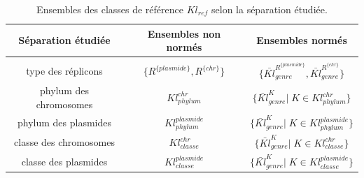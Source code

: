  \begin{table}[h]
	\caption{Ensembles des classes de référence $Kl_{ref}$ selon la séparation étudiée.} \label{tabklref}	
	\begin{center}
 	\begin{tabular}{c|c|c}
	\textbf{Séparation étudiée} & \textbf{Ensembles non normés} & \textbf{Ensembles normés}\\
	\hline
	&\\[-0.2cm]
	type des réplicons & $\{R^{\{plasmide\}}, R^{\{chr\}}\}$ & $\{\bar{Kl}^{R^{\{plasmide\}}}_{genre}, \bar{Kl}_{genre}^{R^{\{chr\}}}\}$\\
	phylum des chromosomes & $Kl_{phylum}^{chr}$ & $\{\bar{Kl}^{K}_{genre}|\;  K \in Kl_{phylum}^{chr}\}$\\
	phylum des plasmides & $Kl_{phylum}^{plasmide}$ & $\{\bar{Kl}^{K}_{genre}|\;  K \in Kl_{phylum}^{plasmide}\}$\\
	classe des chromosomes & $Kl_{classe}^{chr}$ & $\{\bar{Kl}^{K}_{genre}|\;  K \in Kl_{classe}^{chr}\}$\\
	classe des plasmides & $Kl_{classe}^{plasmide}$ & $\{\bar{Kl}^{K}_{genre}|\;  K \in Kl_{classe}^{plasmide}\}$\\
	\end{tabular}
	\end{center}
\end{table}   

    
